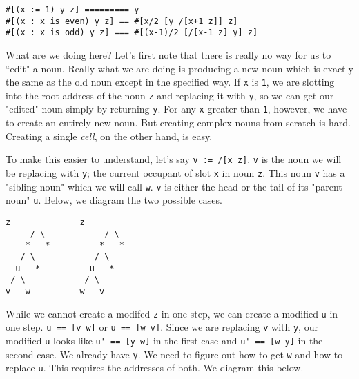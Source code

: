 \documentclass[twoside]{article}
\begin{document}
\begin{lstlisting}[style=listingblock]
#[(x := 1) y z] ========= y
#[(x : x is even) y z] == #[x/2 [y /[x+1 z]] z]
#[(x : x is odd) y z] === #[(x-1)/2 [/[x-1 z] y] z]
\end{lstlisting}

What are we doing here? Let's first note that there is really no way for us to ``edit" a noun. Really what we are doing is producing a new noun which is exactly the same as the old noun except in the specified way. If \lstinline[style=inlinecode]{x} is \lstinline[style=inlinecode]{1}, we are slotting into the root address of the noun \lstinline[style=inlinecode]{z} and replacing it with \lstinline[style=inlinecode]{y}, so we can get our "edited" noun simply by returning \lstinline[style=inlinecode]{y}. For any \lstinline[style=inlinecode]{x} greater than \lstinline[style=inlinecode]{1}, however, we have to create an entirely new noun. But creating complex nouns from scratch is hard. Creating a single \emph{cell}, on the other hand, is easy.

To make this easier to understand, let's say \lstinline[style=inlinecode]{v := /[x z]}. \lstinline[style=inlinecode]{v} is the noun we will be replacing with \lstinline[style=inlinecode]{y}; the current occupant of slot \lstinline[style=inlinecode]{x} in noun \lstinline[style=inlinecode]{z}.  This noun \lstinline[style=inlinecode]{v} has a "sibling noun" which we will call \lstinline[style=inlinecode]{w}. \lstinline[style=inlinecode]{v} is either the head or the tail of its "parent noun" \lstinline[style=inlinecode]{u}. Below, we diagram the two possible cases.

\begin{lstlisting}[style=listingblock]
      z              z
     / \            / \
    *   *          *   *
   / \            / \
  u   *          u   *
 / \            / \
v   w          w   v
\end{lstlisting}

While we cannot create a modifed \lstinline[style=inlinecode]{z} in one step, we can create a modified \lstinline[style=inlinecode]{u} in one step. \lstinline[style=inlinecode]{u == [v w]} or \lstinline[style=inlinecode]{u == [w v]}. Since we are replacing \lstinline[style=inlinecode]{v} with \lstinline[style=inlinecode]{y}, our modified \lstinline[style=inlinecode]{u} looks like \lstinline[style=inlinecode]{u' == [y w]} in the first case and \lstinline[style=inlinecode]{u' == [w y]} in the second case. We already have \lstinline[style=inlinecode]{y}. We need to figure out how to get \lstinline[style=inlinecode]{w} and how to replace \lstinline[style=inlinecode]{u}. This requires the addresses of both. We diagram this below.
\end{document}
